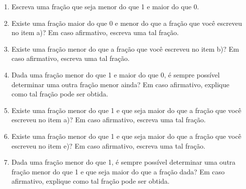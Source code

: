 \documentclass[10 pt,usenames,dvipsnames, oneside]{article}
\begin{document}
\begin{enumerate}
 \item Escreva uma fração que seja menor do que 1 e maior do que 0.
 \item Existe uma fração maior do que 0 e menor do que a fração que você escreveu no item a)? Em caso afirmativo, escreva uma tal fração.
 \item Existe uma fração menor do que a fração que você escreveu no item b)? Em caso afirmativo, escreva uma tal fração.
 \item Dada uma fração menor do que 1 e maior do que 0, é sempre possível determinar uma outra fração menor ainda? Em caso afirmativo, explique como tal fração pode ser obtida.
 \item Existe uma fração menor do que 1 e que seja maior do que a fração que você escreveu no item a)? Em caso afirmativo, escreva uma tal fração.
 \item Existe uma fração menor do que 1 e que seja maior do que a fração que você escreveu no item e)? Em caso afirmativo, escreva uma tal fração.
 \item Dada uma fração menor do que 1, é sempre possível determinar uma outra fração menor do que 1 e que seja maior do que a fração dada? Em caso afirmativo, explique como tal fração pode ser obtida.
\end{enumerate}
\end{document}
